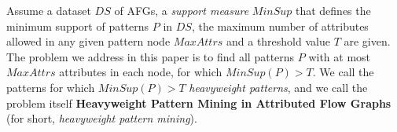 Assume a dataset $DS$ of AFGs, a \emph{support measure} $MinSup$ that defines the minimum support of patterns $P$ in $DS$, the maximum number of attributes allowed in any given pattern node $MaxAttrs$ and a threshold value $T$ are given. The problem we address in this paper is to find all patterns $P$ with at most $MaxAttrs$ attributes in each node, for which $MinSup(P) > T$. We call the patterns for which $MinSup(P) > T$ \emph{heavyweight patterns}, and we call the problem itself {\bf Heavyweight Pattern Mining in Attributed Flow Graphs} (for short, \emph{heavyweight pattern mining}).


